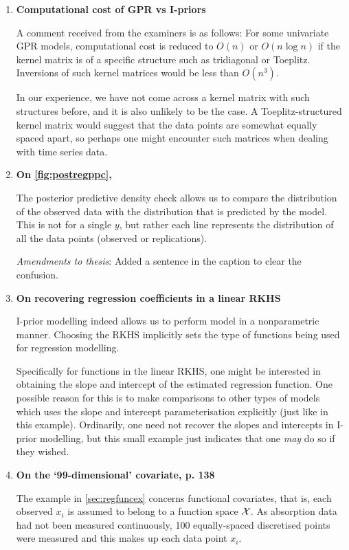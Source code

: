 \documentclass[11pt,showframe,twoside,openright]{report}
\begin{document}
\begin{enumerate}
  \item \textbf{Computational cost of GPR vs I-priors}

  A comment received from the examiners is as follows: For some univariate GPR models, computational cost is reduced to $O(n)$ or $O(n\log n)$ if the kernel matrix is of a specific structure such as tridiagonal or Toeplitz.
  Inversions of such kernel matrices would be less than $O(n^3)$.
  
  In our experience, we have not come across a kernel matrix with such structures before, and it is also unlikely to be the case.
  A Toeplitz-structured kernel matrix would suggest that the data points are somewhat equally spaced apart, so perhaps one might encounter such matrices when dealing with time series data.
  
  \item \textbf{On \cref{fig:postregppc}, }

  The posterior predictive density check allows us to compare the distribution of the observed data with the distribution that is predicted by the model. 
  This is not for a single $y$, but rather each line represents the distribution of all the data points (observed or replications).
  
  \textit{Amendments to thesis}: Added a sentence in the caption to clear the confusion.
  
  \item \textbf{On recovering regression coefficients in a linear RKHS}

  I-prior modelling indeed allows us to perform model in a nonparametric manner.
  Choosing the RKHS implicitly sets the type of functions being used for regression modelling.
  
  Specifically for functions in the linear RKHS, one might be interested in obtaining the slope and intercept of the estimated regression function.
  One possible reason for this is to make comparisons to other types of models which uses the slope and intercept parameterisation explicitly (just like in this example).
  Ordinarily, one need not recover the slopes and intercepts in I-prior modelling, but this small example just indicates that one \emph{may} do so if they wished.

  \item \textbf{On the `99-dimensional' covariate, p. 138}
  
  The example in \cref{sec:regfuncex}  concerns functional covariates, that is, each observed $x_i$ is assumed to belong to a function space ${\mathcal X}$. 
  As absorption data had not been measured continuously, 100 equally-spaced discretised points were measured and this makes up each data point $x_i$.
  

\end{enumerate}
\end{document}
